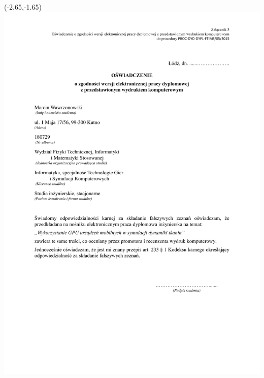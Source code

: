 \documentclass[12pt, oneside, a4paper]{mwbk}
\begin{document}
\begin{textblock}{1}(-2.65,-1.65)
	\includegraphics{figures/zal3.pdf}
\end{textblock}
\end{document}

